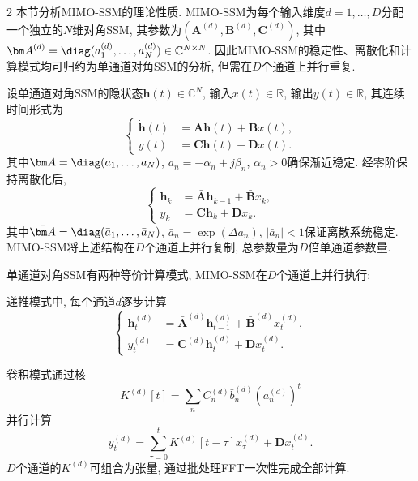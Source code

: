 \begin{multicols}{2}
本节分析MIMO-SSM的理论性质.
MIMO-SSM为每个输入维度$d=1,\ldots,D$分配一个独立的$N$维对角SSM,
其参数为$({\bm A}^{(d)}, {\bm B}^{(d)}, {\bm C}^{(d)})$,
其中${\bm A}^{(d)} = \diag(a_1^{(d)}, \ldots, a_N^{(d)}) \in \mathbb{C}^{N \times N}$.
因此MIMO-SSM的稳定性、离散化和计算模式均可归约为单通道对角SSM的分析,
但需在$D$个通道上并行重复.

设单通道对角SSM的隐状态${\bm h}(t) \in \mathbb{C}^N$,
输入$x(t) \in \mathbb{R}$, 输出$y(t) \in \mathbb{R}$, 其连续时间形式为
\begin{equation}
\left\{\begin{aligned}
\dot{{\bm h}}(t) &= {\bm A}{\bm h}(t) + {\bm B}x(t), \\
y(t) &= {\bm C}{\bm h}(t) + {\bm D}x(t).
\end{aligned}\right.
\end{equation}
其中${\bm A} = \diag(a_1, \ldots, a_N)$,
$a_n = -\alpha_n + j\beta_n$, $\alpha_n > 0$确保渐近稳定.
经零阶保持离散化后,
\begin{equation}
\left\{\begin{aligned}
{\bm h}_k &= \bar{{\bm A}}{\bm h}_{k-1} + \bar{{\bm B}}x_k, \\
y_k &= {\bm C}{\bm h}_k + {\bm D}x_k.
\end{aligned}\right.
\end{equation}
其中$\bar{{\bm A}} = \diag(\bar{a}_1, \ldots, \bar{a}_N)$,
$\bar{a}_n = \exp(\Delta a_n)$, $|\bar{a}_n| < 1$保证离散系统稳定.
MIMO-SSM将上述结构在$D$个通道上并行复制, 总参数量为$D$倍单通道参数量.

\begin{Def}
\label{def:ssm_modes}
单通道对角SSM有两种等价计算模式, MIMO-SSM在$D$个通道上并行执行:

递推模式中, 每个通道$d$逐步计算
\begin{equation}
\label{eq:recurrent}
\left\{\begin{aligned}
{\bm h}_t^{(d)} &= \bar{{\bm A}}^{(d)}{\bm h}_{t-1}^{(d)} + \bar{{\bm B}}^{(d)}x_t^{(d)}, \\
y_t^{(d)} &= {\bm C}^{(d)}{\bm h}_t^{(d)} + {\bm D}x_t^{(d)}.
\end{aligned}\right.
\end{equation}

卷积模式通过核
\begin{equation}
K^{(d)}[t] = \sum_n C_n^{(d)}\bar{b}_n^{(d)}(\bar{a}_n^{(d)})^t
\end{equation}
并行计算
\begin{equation}
\label{eq:convolution}
y_t^{(d)} = \sum_{\tau=0}^{t} K^{(d)}[t{-}\tau] x_\tau^{(d)} + {\bm D}x_t^{(d)}.
\end{equation}
$D$个通道的$K^{(d)}$可组合为张量, 通过批处理FFT一次性完成全部计算.
\end{Def}


\end{multicols}
